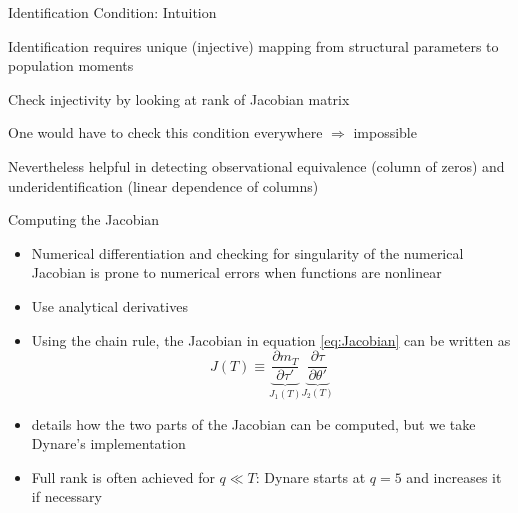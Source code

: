 \begin{frame}{Identification Condition: Intuition}

\begin{witemize}
\item Identification requires unique (injective) mapping from structural parameters to population moments
\item Check injectivity by looking at rank of Jacobian matrix
\item One would have to check this condition everywhere $\Rightarrow$ impossible
\item Nevertheless helpful in detecting observational equivalence (column of zeros) and underidentification (linear dependence of columns)
\end{witemize}
\end{frame}


\begin{frame}{Computing the Jacobian}
\begin{itemize}
\item Numerical differentiation and checking for singularity of the numerical Jacobian is prone to numerical errors when functions are nonlinear
\item[$\Rightarrow$] Use analytical derivatives
\item Using the chain rule, the Jacobian in equation \eqref{eq:Jacobian} can be written as
\begin{equation}
J(T) \equiv \underbrace {\frac{{\partial {m_T}}}{{\partial \tau '}}}_{{J_1}\left( T \right)}\underbrace {\frac{{\partial \tau }}{{\partial \theta '}}}_{{J_2}\left( T \right)} \label{eq:Jacobian_chain}
\end{equation}
\item \textcite{Iskrev2010} details how the two parts of the Jacobian can be computed, but we take Dynare's implementation
\item Full rank is often achieved for $q\ll T$: Dynare starts at $q=5$ and increases it if necessary
\end{itemize}
\end{frame}

